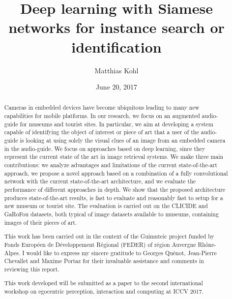 \documentclass[12pt, a4paper]{memoir} %
\title{Deep learning with Siamese networks for instance search or identification} %
\author{Matthias Kohl}
\date{June 20, 2017} %
\begin{document}
\frontmatter
\begin{titlingpage}
\maketitle
\end{titlingpage}

\setlength{\parskip}{-1pt plus 1pt}

\renewcommand{\abstracttextfont}{\normalfont}
\abstractintoc
\begin{abstract}
Cameras in embedded devices have become ubiquitous leading to many new
capabilities for mobile platforms. In our research, we focus on an augmented
audio-guide for museums and tourist sites. In particular, we aim at
developing a system capable of identifying the object of interest or
piece of art that a user of the audio-guide is looking at using solely
the visual clues of an image from an embedded camera in the audio-guide.
We focus on approaches based on deep learning, since they represent the
current state of the art in image retrieval systems.
We make three main contributions:
we analyze advantages and limitations of the current state-of-the-art
approach, we propose a novel approach based on a combination of a fully
convolutional network with the current state-of-the-art architecture,
and we evaluate the performance of different approaches in depth.
We show that the proposed architecture produces state-of-the-art results,
is fast to evaluate and reasonably fast to setup for a new museum or
tourist site. The evaluation is carried out on the CLICIDE and GaRoFou
datasets, both typical of image datasets available to museums,
containing images of their pieces of art.
\end{abstract}
\abstractintoc

\renewcommand\abstractname{Acknowledgement}
\begin{abstract}
This work has been carried out in the context of the Guimuteic project
funded by Fonds Européen de Développement Régional (FEDER) of région
Auvergne Rhône-Alpes.
I would like to express my sincere gratitude to Georges Quénot,
Jean-Pierre Chevallet and Maxime Portaz for their invaluable assistance
and comments in reviewing this report.
\end{abstract}

\renewcommand\abstractname{Publication}
\begin{abstract}
This work developed will be submitted as a
paper to the second international workshop on egocentric perception,
interaction and computing at ICCV 2017.
\end{abstract}
\end{document}
